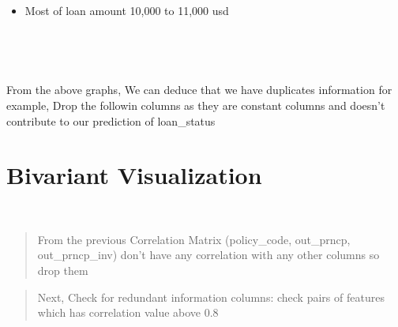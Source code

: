 \documentclass[11pt]{article}
\providecommand{\tightlist}{%
      \setlength{\itemsep}{0pt}\setlength{\parskip}{0pt}}
\begin{document}
    \begin{center}
    \end{center}
    { \hspace*{\fill} \\}
    
    \begin{itemize}
\tightlist
\item
  Most of loan amount 10,000 to 11,000 usd
\end{itemize}

    \begin{center}
    \end{center}
    { \hspace*{\fill} \\}
    
    \begin{center}
    \end{center}
    { \hspace*{\fill} \\}
    
    From the above graphs, We can deduce that we have duplicates information
for example, Drop the followin columns as they are constant columns and
doesn't contribute to our prediction of loan\_status

    \section{Bivariant Visualization}

    \begin{center}
    \end{center}
    { \hspace*{\fill} \\}
    
    \begin{quote}
From the previous Correlation Matrix (policy\_code, out\_prncp,
out\_prncp\_inv) don't have any correlation with any other columns so
drop them
\end{quote}

    \begin{quote}
Next, Check for redundant information columns: check pairs of features
which has correlation value above 0.8
\end{quote}
\end{document}
